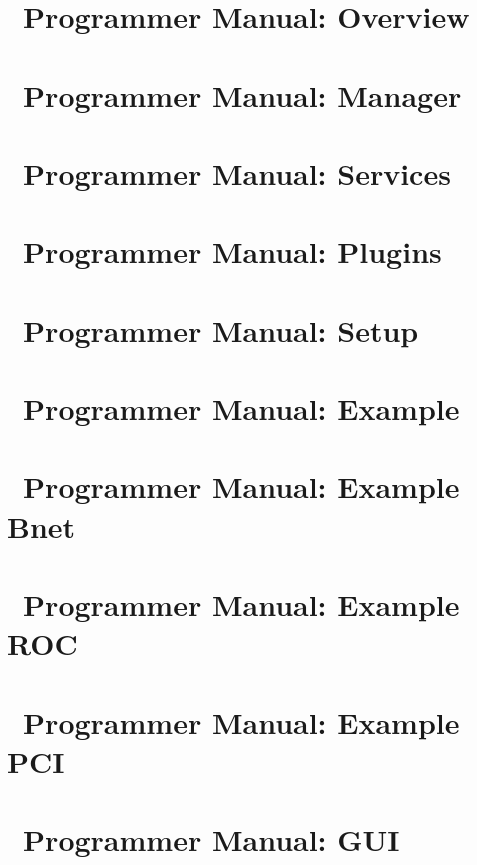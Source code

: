 
\chapter{\dabc\ Programmer Manual: Overview}
 \cleardoublepage
% 
\chapter{\dabc\ Programmer Manual: Manager}
 \cleardoublepage
\chapter{\dabc\ Programmer Manual: Services}
 \cleardoublepage
\chapter{\dabc\ Programmer Manual: Plugins}
 \cleardoublepage


\chapter{\dabc\ Programmer Manual: Setup}
 \cleardoublepage
\chapter{\dabc\ Programmer Manual: Example \mbs}
 \cleardoublepage
\chapter{\dabc\ Programmer Manual: Example Bnet}
 \cleardoublepage
\chapter{\dabc\ Programmer Manual: Example ROC}
 \cleardoublepage
\chapter{\dabc\ Programmer Manual: Example PCI}
 \cleardoublepage
\chapter{\dabc\ Programmer Manual: GUI}
 \cleardoublepage
